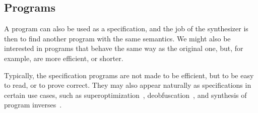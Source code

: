 \subsection{Programs}
\label{sec:programs}

A program can also be used as a specification, and the job of the synthesizer is
then to find another program with the same semantics.
We might also be interested in programs that behave the same way as the original
one, but, for example, are more efficient, or shorter.

Typically, the specification programs are not made to be efficient, but to be
easy to read, or to prove correct.
They may also appear naturally as specifications in certain use cases, such as
superoptimization~\cite{Phothilimthana:2016:SUS},
deobfuscation~\cite{Jha:oracle:2010}, and
synthesis of program inverses~\cite{Srivastava:2011:PIS}.
